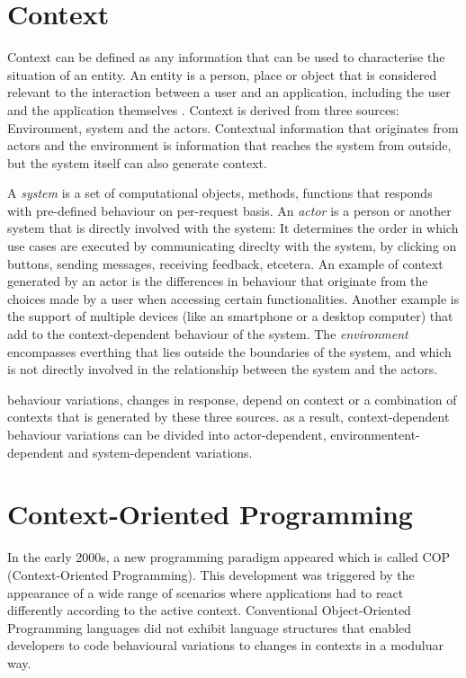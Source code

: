 \documentclass{acm_proc_article-sp}
\begin{document}
\section{Context}\label{context}
Context can be defined as any information that can be used to characterise the situation of an entity. An entity is a person, place or object that is considered relevant to the interaction between a user and an application, including the user and the application themselves \cite{Abowd:1999:TBU:647985.743843}. Context is derived from three sources: Environment, system and the actors. Contextual information that originates from actors and the environment is information that reaches the system from outside, but the system itself can also generate context. 

A \textit{system} is a set of computational objects, methods, functions that responds with pre-defined behaviour on per-request basis. An \textit{actor} is a person or another system that is directly involved with the system: It determines the order in which use cases are executed by communicating direclty with the system, by clicking on buttons, sending messages, receiving feedback, etcetera. An example of context generated by an actor is the differences in behaviour that originate from the choices made by a user when accessing certain functionalities. Another example is the support of multiple devices (like an smartphone or a desktop computer) that add to the context-dependent behaviour of the system. The \textit{environment} encompasses everthing that lies outside the boundaries of the system, and which is not directly involved in the relationship between the system and the actors.

behaviour variations, changes in response, depend on context or a combination of contexts that is generated by these three sources. as a result, context-dependent behaviour variations can be divided into actor-dependent, environmentent-dependent and system-dependent variations.

\section{Context-Oriented Programming}\label{cop}
In the early 2000s, a new programming paradigm appeared which is called COP (Context-Oriented Programming). This development was triggered by the appearance of a wide range of scenarios where applications had to react differently according to the active context. Conventional Object-Oriented Programming languages did not exhibit language structures that enabled developers to code behavioural variations to changes in contexts in a moduluar way. 
\end{document}
